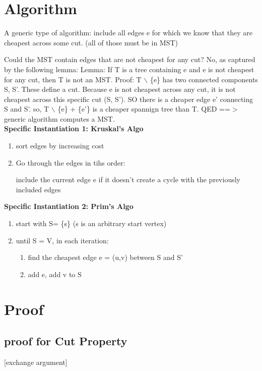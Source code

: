 \documentclass{article}
\begin{document}
\section{Algorithm}
A generic type of algorithm:
include all edges e for which we know that they are cheapest across some cut.
(all of those must be in MST)

Could the MST contain edges that are not cheapest for any cut?
No, as captured by the following lemma:
Lemma: If T is a tree containing e and e is not cheapest for any cut, then T is not an MST.
Proof: T $\backslash$ \{e\} has two connected components S, S'. These define a cut. Because e is not cheapest across any cut, it is not cheapest across this specific cut (S, S'). SO there is a cheaper edge e' connecting S and S'. so, T $\backslash$ \{e\} + \{e'\} is a cheaper spannign tree than T. QED
==$>$ generic algorithm computes a MST.\\

\textbf{Specific Instantiation 1: Kruskal's Algo}
\begin{enumerate}
    \item sort edges by increasing cost
    \item Go through the edges in tihs order:

    include the current edge e if it doesn't create a cycle with the previously included edges
\end{enumerate}

\textbf{Specific Instantiation 2: Prim's Algo}
\begin{enumerate}
    \item start with S= \{s\} (s is an arbitrary start vertex)
    \item until S = V, in each iteration:
        \begin{enumerate}
            \item find the cheapest edge e = (u,v) between S and S'
            \item add e, add v to S
        \end{enumerate}
\end{enumerate}

\section{Proof}
\subsection{proof for Cut Property}
[exchange argument]
\end{document}
